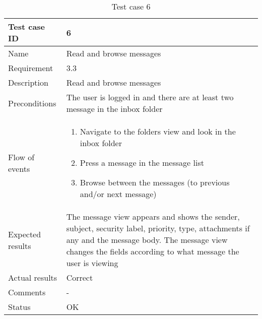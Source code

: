 		\begin{table}[htb]
			\begin{tabular}{l|p{10cm}}
				Test case ID & 6 \\ \hline
				Name & Read and browse messages\\ \hline
				Requirement & 3.3\\ \hline
				Description & Read and browse messages\\ \hline
				Preconditions & The user is logged in and there are at least two message in the inbox folder\\ \hline
				Flow of events & 
					\begin{enumerate}
						\item{}Navigate to the folders view and look in the inbox folder
						\item{}Press a message in the message list
						\item{}Browse between the messages (to previous and/or next message)
					\end{enumerate} \\ \hline
				Expected results & The message view appears and shows the sender, subject, security label, priority, 							type, attachments if any and the message body. The message view changes the fields according to 						what message the user is viewing \\ \hline
				Actual results & Correct\\ \hline
				Comments & -\\ \hline
				Status & OK\\ \hline
			\end{tabular}
			\caption{Test case 6} \label{tab:case6}
		\end{table}

